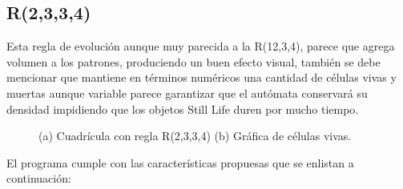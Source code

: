 \subsection{R(2,3,3,4)}
Esta regla de evolución aunque muy parecida a la R(12,3,4), parece que agrega volumen a los patrones, produciendo un buen efecto visual, también se debe mencionar que mantiene en términos numéricos una cantidad de células vivas y muertas aunque variable parece garantizar que el autómata conservará su densidad impidiendo que los objetos Still Life duren por mucho tiempo.
\begin{figure}[h]
	\centering
	\caption{(a) Cuadrícula con regla R(2,3,3,4) (b) Gráfica de células vivas.}
	\label{fig:R2334}
\end{figure}

\newpage


El programa cumple con las características propuesas que se enlistan a continuación:

